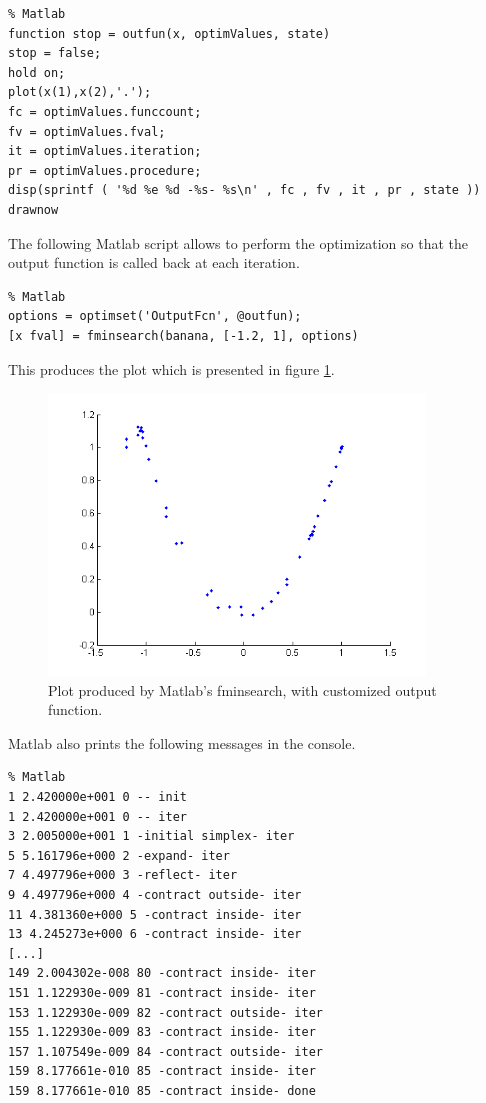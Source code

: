 \lstset{language=matlabscript}
\begin{lstlisting}
% Matlab
function stop = outfun(x, optimValues, state)
stop = false;
hold on;
plot(x(1),x(2),'.');
fc = optimValues.funccount;
fv = optimValues.fval;
it = optimValues.iteration;
pr = optimValues.procedure;
disp(sprintf ( '%d %e %d -%s- %s\n' , fc , fv , it , pr , state ))
drawnow
\end{lstlisting}

The following Matlab script allows to perform the optimization
so that the output function is called back at each iteration.

\lstset{language=matlabscript}
\begin{lstlisting}
% Matlab
options = optimset('OutputFcn', @outfun);
[x fval] = fminsearch(banana, [-1.2, 1], options)
\end{lstlisting}

This produces the plot which is presented in figure \ref{fig-fminsearch-matlab-outputfun}.

\begin{figure}
\begin{center}
\includegraphics[width=10cm]{fminsearch/testFminsearchPlotMatlab.png}
\end{center}
\caption{Plot produced by Matlab's fminsearch, with customized output function.}
\label{fig-fminsearch-matlab-outputfun}
\end{figure}

Matlab also prints the following messages in the console.

\lstset{language=matlabscript}
\begin{lstlisting}
% Matlab
1 2.420000e+001 0 -- init
1 2.420000e+001 0 -- iter
3 2.005000e+001 1 -initial simplex- iter
5 5.161796e+000 2 -expand- iter
7 4.497796e+000 3 -reflect- iter
9 4.497796e+000 4 -contract outside- iter
11 4.381360e+000 5 -contract inside- iter
13 4.245273e+000 6 -contract inside- iter
[...]
149 2.004302e-008 80 -contract inside- iter
151 1.122930e-009 81 -contract inside- iter
153 1.122930e-009 82 -contract outside- iter
155 1.122930e-009 83 -contract inside- iter
157 1.107549e-009 84 -contract outside- iter
159 8.177661e-010 85 -contract inside- iter
159 8.177661e-010 85 -contract inside- done
\end{lstlisting}

